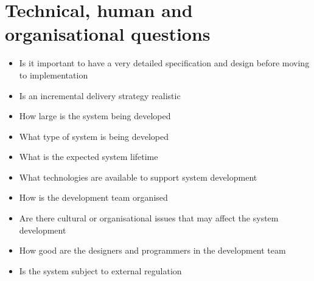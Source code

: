 \documentclass{article}[18pt]
\begin{document}
\section{Technical, human and organisational questions}
\begin{itemize}
	\item Is it important to have a very detailed specification and design before moving to implementation
	\item Is an incremental delivery strategy realistic
	\item How large is the system being developed
	\item What type of system is being developed
	\item What is the expected system lifetime
	\item What technologies are available to support system development
	\item How is the development team organised
	\item Are there cultural or organisational issues that may affect the system development
	\item How good are the designers and programmers in the development team
	\item Is the system subject to external regulation
\end{itemize}
\end{document}
